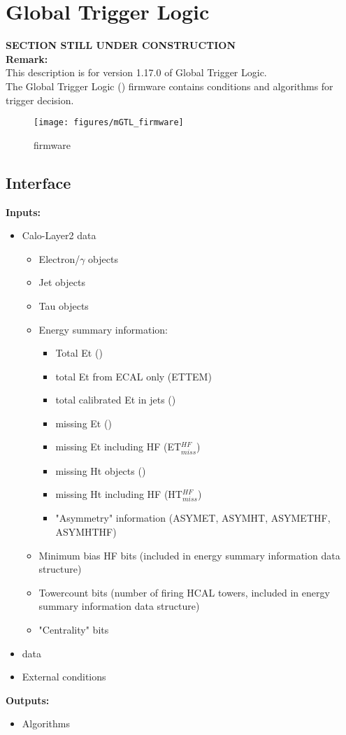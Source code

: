 \section{Global Trigger Logic}
\label{sec:gtl:global_trigger_logic}

\textbf{SECTION STILL UNDER CONSTRUCTION}\\

\textbf{Remark:}\\
This description is for version 1.17.0 of Global Trigger Logic.\\

The Global Trigger Logic (\ugtl) firmware contains conditions and algorithms for trigger decision.


\begin{figure}[htb]
\centering
\texttt{[image: figures/mGTL\_firmware]}
\caption{\ugtl firmware}
\label{fig:gtl:mGTL_firmware}
\end{figure}

\subsection{\ugtl Interface}
\label{sec:gtl:ugtl_interface}

\textbf{Inputs:}
\begin{itemize}
\item Calo-Layer2 data
\begin{itemize}
\item Electron/$\gamma$ objects
\item Jet objects
\item Tau objects
\item Energy summary information:
\begin{itemize}
\item Total Et (\ett)
\item total Et from ECAL only (ETTEM)
\item total calibrated Et in jets (\htt)
\item missing Et (\etm)
\item missing Et including HF (ET$_{miss}^{HF}$)
\item missing Ht objects (\htm)
\item missing Ht including HF (HT$_{miss}^{HF}$)
\item "Asymmetry" information (ASYMET, ASYMHT, ASYMETHF, ASYMHTHF)
\end{itemize}
\item Minimum bias HF bits (included in energy summary information data structure)
\item Towercount bits (number of firing HCAL towers, included in energy summary information data structure)
\item "Centrality" bits
\end{itemize}
\item \gmt data
\item External conditions
\end{itemize}
\textbf{Outputs:}
\begin{itemize}
\item Algorithms
\end{itemize}

